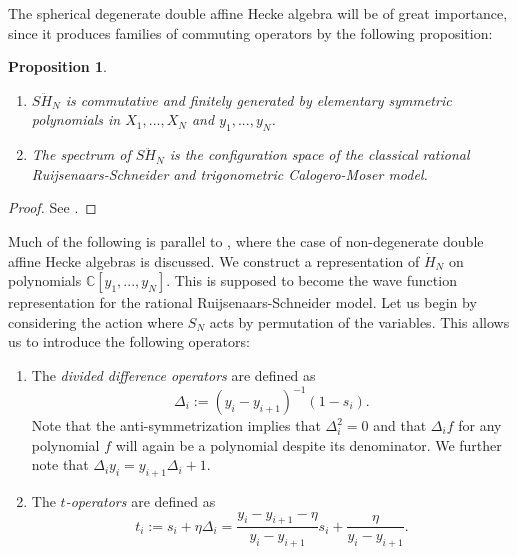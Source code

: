 \documentclass[11pt]{report}
\newtheorem{prop}[theorem]{Proposition}
\theoremstyle{definition}
\theoremstyle{remark}
\theoremstyle{remark}
\newcommand{\C}{\mathbb{C}}
\begin{document}
The spherical degenerate double affine Hecke algebra will be of great importance, since it produces families of commuting operators by the following proposition: 

\begin{prop}
\begin{enumerate}[label=(\roman*)]
\item $S\ddot H_N$ is commutative and finitely generated by elementary symmetric polynomials in $X_1,...,X_N$ and $y_1,...,y_N$.
\item The spectrum of $S\ddot H_N$ is the configuration space of the classical rational Ruijsenaars-Schneider and trigonometric Calogero-Moser model.
\end{enumerate}
\end{prop}

\begin{proof}
See \cite{article:oblomkov:2003}.
\end{proof}

Much of the following is parallel to \cite{article:lamers:2022}, where the case of non-degenerate double affine Hecke algebras is discussed. We construct a representation of $\dot H_N$ on polynomials $\C[y_1,...,y_N]$. This is supposed to become the wave function representation for the rational Ruijsenaars-Schneider model. Let us begin by considering the action where $S_N$ acts by permutation of the variables. This allows us to introduce the following operators:
\begin{enumerate}[label=(\roman*)]
\item The \emph{divided difference operators} are defined as
\begin{equation*}
\Delta_i := (y_i-y_{i+1})^{-1} (1-s_i).
\end{equation*}
Note that the anti-symmetrization implies that $\Delta_i^2 = 0$ and that $\Delta_i f$ for any polynomial $f$ will again be a polynomial despite its denominator. We further note that $\Delta_i y_i = y_{i+1} \Delta_i + 1$.
\item The \emph{$t$-operators} are defined as
\begin{equation*}
t_i := s_i + \eta \Delta_i = \frac{y_i-y_{i+1}-\eta}{y_i-y_{i+1}} s_i + \frac{\eta}{y_i-y_{i+1}}.
\end{equation*}
\end{enumerate}
\end{document}
